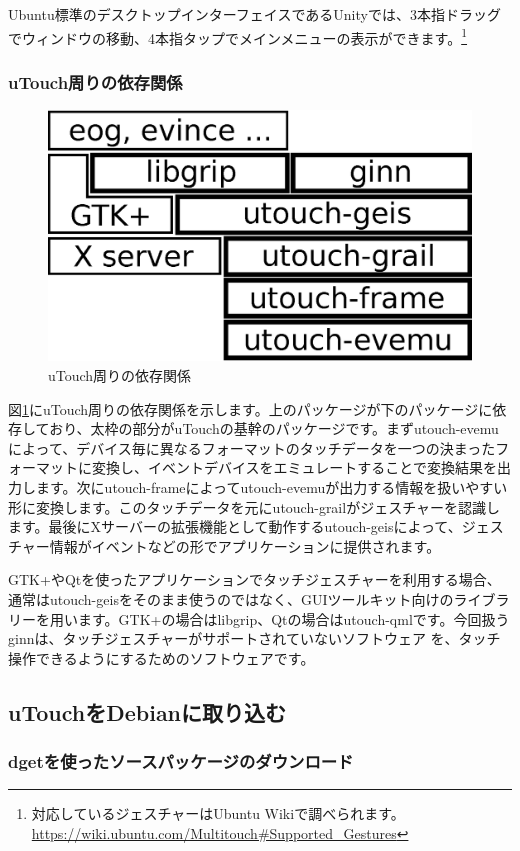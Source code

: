 \documentclass[mingoth,a4paper]{jsarticle}
\begin{document}
Ubuntu標準のデスクトップインターフェイスであるUnityでは、3本指ドラッグでウィンドウの移動、4本指タップでメインメニューの表示ができます。\footnote{対応しているジェスチャーはUbuntu Wikiで調べられます。\url{https://wiki.ubuntu.com/Multitouch\#Supported_Gestures}}

\subsubsection{uTouch周りの依存関係}

\begin{figure}[ht]
  \begin{center}
    \includegraphics[width=0.4\hsize]{image2012-gum/utouch-depends.eps}
  \end{center}
  \caption{uTouch周りの依存関係}
  \label{fig:image01}
\end{figure}

図\ref{fig:image01}にuTouch周りの依存関係を示します。上のパッケージが下のパッケージに依存しており、太枠の部分がuTouchの基幹のパッケージです。まずutouch-evemuによって、デバイス毎に異なるフォーマットのタッチデータを一つの決まったフォーマットに変換し、イベントデバイスをエミュレートすることで変換結果を出力します。次にutouch-frameによってutouch-evemuが出力する情報を扱いやすい形に変換します。このタッチデータを元にutouch-grailがジェスチャーを認識します。最後にXサーバーの拡張機能として動作するutouch-geisによって、ジェスチャー情報がイベントなどの形でアプリケーションに提供されます。

GTK+やQtを使ったアプリケーションでタッチジェスチャーを利用する場合、通常はutouch-geisをそのまま使うのではなく、GUIツールキット向けのライブラリーを用います。GTK+の場合はlibgrip、Qtの場合はutouch-qmlです。今回扱うginnは、タッチジェスチャーがサポートされていないソフトウェア	を、タッチ操作できるようにするためのソフトウェアです。

\subsection{uTouchをDebianに取り込む}

\subsubsection{dgetを使ったソースパッケージのダウンロード}
\end{document}
